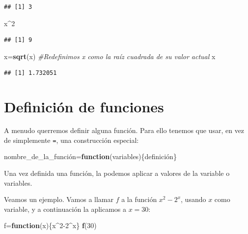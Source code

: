 \documentclass[]{book}
\newenvironment{Shaded}{\begin{snugshade}}{\end{snugshade}}
\newcommand{\CommentTok}[1]{\textcolor[rgb]{0.56,0.35,0.01}{\textit{#1}}}
\newcommand{\ControlFlowTok}[1]{\textcolor[rgb]{0.13,0.29,0.53}{\textbf{#1}}}
\newcommand{\DecValTok}[1]{\textcolor[rgb]{0.00,0.00,0.81}{#1}}
\newcommand{\KeywordTok}[1]{\textcolor[rgb]{0.13,0.29,0.53}{\textbf{#1}}}
\newcommand{\NormalTok}[1]{#1}
\newcommand{\OperatorTok}[1]{\textcolor[rgb]{0.81,0.36,0.00}{\textbf{#1}}}
\theoremstyle{definition}
\theoremstyle{definition}
\theoremstyle{definition}
\theoremstyle{remark}
\begin{document}
\begin{verbatim}
## [1] 3
\end{verbatim}

\begin{Shaded}
\begin{Highlighting}[]
\NormalTok{x}\OperatorTok{^}\DecValTok{2}
\end{Highlighting}
\end{Shaded}

\begin{verbatim}
## [1] 9
\end{verbatim}

\begin{Shaded}
\begin{Highlighting}[]
\NormalTok{x=}\KeywordTok{sqrt}\NormalTok{(x) }\CommentTok{#Redefinimos x como la raíz cuadrada de su valor actual}
\NormalTok{x}
\end{Highlighting}
\end{Shaded}

\begin{verbatim}
## [1] 1.732051
\end{verbatim}

\hypertarget{definicion-de-funciones}{%
\section{Definición de funciones}\label{definicion-de-funciones}}

A menudo querremos definir alguna función. Para ello tenemos que usar, en vez de simplemente \texttt{=}, una construcción especial:

\begin{Shaded}
\begin{Highlighting}[]
\NormalTok{nombre_de_la_función=}\ControlFlowTok{function}\NormalTok{(variables)\{definición\}}
\end{Highlighting}
\end{Shaded}

Una vez definida una función, la podemos aplicar a valores de la variable o variables.

Veamos un ejemplo. Vamos a llamar \(f\) a la función \(x^2-2^x\), usando \(x\) como variable, y a continuación la aplicamos a \(x=30\):

\begin{Shaded}
\begin{Highlighting}[]
\NormalTok{f=}\ControlFlowTok{function}\NormalTok{(x)\{x}\OperatorTok{^}\DecValTok{2-2}\OperatorTok{^}\NormalTok{x\}}
\KeywordTok{f}\NormalTok{(}\DecValTok{30}\NormalTok{)}
\end{Highlighting}
\end{Shaded}
\end{document}
